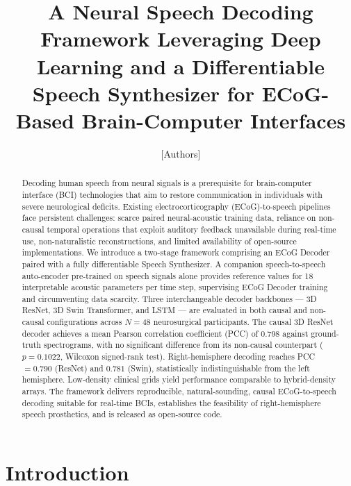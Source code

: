 \documentclass[10pt]{article}
\title{A Neural Speech Decoding Framework Leveraging Deep Learning and a Differentiable Speech Synthesizer for ECoG-Based Brain-Computer Interfaces}
\author{[Authors]}
\date{}
\begin{document}
\maketitle

\begin{abstract}
Decoding human speech from neural signals is a prerequisite for brain-computer interface (BCI) technologies that aim to restore communication in individuals with severe neurological deficits. Existing electrocorticography (ECoG)-to-speech pipelines face persistent challenges: scarce paired neural-acoustic training data, reliance on non-causal temporal operations that exploit auditory feedback unavailable during real-time use, non-naturalistic reconstructions, and limited availability of open-source implementations. We introduce a two-stage framework comprising an ECoG Decoder paired with a fully differentiable Speech Synthesizer. A companion speech-to-speech auto-encoder pre-trained on speech signals alone provides reference values for 18 interpretable acoustic parameters per time step, supervising ECoG Decoder training and circumventing data scarcity. Three interchangeable decoder backbones --- 3D ResNet, 3D Swin Transformer, and LSTM --- are evaluated in both causal and non-causal configurations across $N=48$ neurosurgical participants. The causal 3D ResNet decoder achieves a mean Pearson correlation coefficient (PCC) of $0.798$ against ground-truth spectrograms, with no significant difference from its non-causal counterpart ($p=0.1022$, Wilcoxon signed-rank test). Right-hemisphere decoding reaches PCC $=0.790$ (ResNet) and $0.781$ (Swin), statistically indistinguishable from the left hemisphere. Low-density clinical grids yield performance comparable to hybrid-density arrays. The framework delivers reproducible, natural-sounding, causal ECoG-to-speech decoding suitable for real-time BCIs, establishes the feasibility of right-hemisphere speech prosthetics, and is released as open-source code.
\end{abstract}

\section{Introduction}
\end{document}
